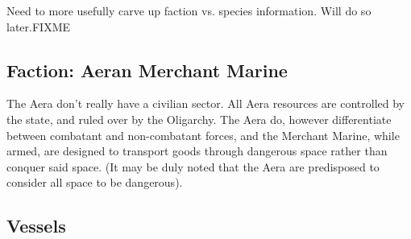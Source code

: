Need to more usefully carve up faction vs. species information. Will
do so later.FIXME

\subsection{Faction: Aeran Merchant Marine}


The Aera don't really have a civilian sector. All Aera resources are
controlled by the state, and ruled over by the Oligarchy. The Aera do,
however differentiate between combatant and non-combatant forces, and
the Merchant Marine, while armed, are designed to transport goods
through dangerous space rather than conquer said space. (It may be
duly noted that the Aera are predisposed to consider all space to be
dangerous).

\subsection{Vessels}

